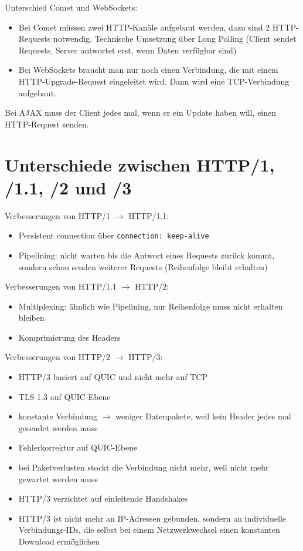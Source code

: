 \documentclass{article}
\begin{document}
	Unterschied Comet und WebSockets:
	\begin{itemize}
		\item Bei Comet müssen zwei HTTP-Kanäle aufgebaut werden, dazu sind 2 HTTP-Requests notwendig. Technische Umsetzung über Long Polling (Client sendet Requests, Server antwortet erst, wenn Daten verfügbar sind)
		\item Bei WebSockets braucht man nur noch einen Verbindung, die mit einem HTTP-Upgrade-Request eingeleitet wird. Dann wird eine TCP-Verbindung aufgebaut.
	\end{itemize}
	Bei AJAX muss der Client jedes mal, wenn er ein Update haben will, einen HTTP-Request senden.
	
	\section*{Unterschiede zwischen HTTP/1, /1.1, /2 und /3}
	
	Verbesserungen von HTTP/1 $\to$ HTTP/1.1:
	\begin{itemize}
		\item Persistent connection über \texttt{connection: keep-alive}
		\item Pipelining: nicht warten bis die Antwort eines Requests zurück kommt, sondern schon senden weiterer Requests (Reihenfolge bleibt erhalten)
	\end{itemize}

	Verbesserungen von HTTP/1.1 $\to$ HTTP/2:
	\begin{itemize}
		\item Multiplexing: ähnlich wie Pipelining, nur Reihenfolge muss nicht erhalten bleiben
		\item Komprimierung des Headers
	\end{itemize}

	Verbesserungen von HTTP/2 $\to$ HTTP/3:
	\begin{itemize}
		\item HTTP/3 basiert auf QUIC und nicht mehr auf TCP
		\item TLS 1.3 auf QUIC-Ebene
		\item konstante Verbindung $\to$ weniger Datenpakete, weil kein Header jedes mal gesendet werden muss
		\item Fehlerkorrektur auf QUIC-Ebene
		\item bei Paketverlusten stockt die Verbindung nicht mehr, weil nicht mehr gewartet werden muss
		\item HTTP/3 verzichtet auf einleitende Handshakes
		\item HTTP/3 ist nicht mehr an IP-Adressen gebunden, sondern an individuelle Verbindungs-IDs, die selbst bei einem Netzwerkwechsel einen konstanten Download ermöglichen
	\end{itemize}
	
\end{document}
